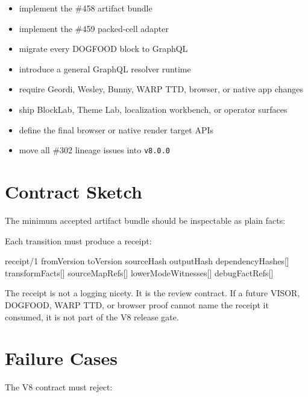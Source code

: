 \begin{itemize}
\tightlist
\item
  implement the \#458 artifact bundle
\item
  implement the \#459 packed-cell adapter
\item
  migrate every DOGFOOD block to GraphQL
\item
  introduce a general GraphQL resolver runtime
\item
  require Geordi, Wesley, Bunny, WARP TTD, browser, or native app changes
\item
  ship BlockLab, Theme Lab, localization workbench, or operator surfaces
\item
  define the final browser or native render target APIs
\item
  move all \#302 lineage issues into \texttt{v\allowbreak{}8\allowbreak{}.\allowbreak{}0\allowbreak{}.\allowbreak{}0}
\end{itemize}

\section{Contract Sketch}\label{record-144-contract-sketch}

The minimum accepted artifact bundle should be inspectable as plain facts:



Each transition must produce a receipt:

\begin{CodeBlock}
receipt/1 {
  fromVersion
  toVersion
  sourceHash
  outputHash
  dependencyHashes[]
  transformFacts[]
  sourceMapRefs[]
  lowerModeWitnesses[]
  debugFactRefs[]
}
\end{CodeBlock}

The receipt is not a logging nicety. It is the review contract. If a future VISOR, DOGFOOD, WARP TTD, or browser proof cannot name the receipt it consumed, it is not part of the V8 release gate.

\section{Failure Cases}\label{record-144-failure-cases}

The V8 contract must reject:


